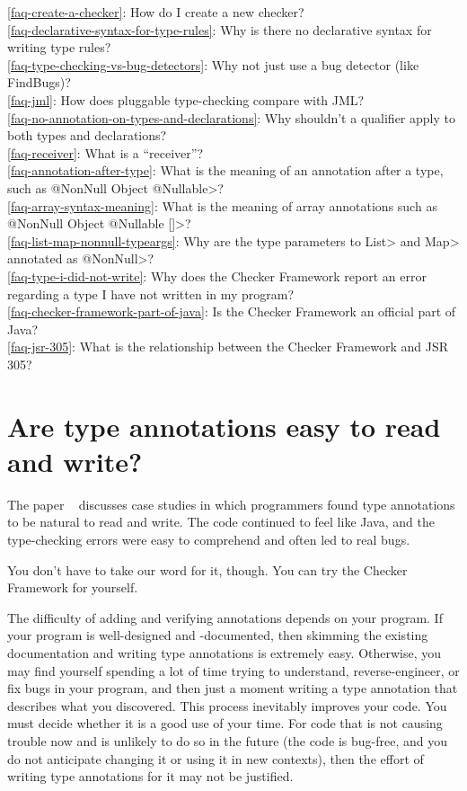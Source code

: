\ref{faq-create-a-checker}: How do I create a new checker? \\
\ref{faq-declarative-syntax-for-type-rules}: Why is there no declarative syntax for writing type rules? \\
\ref{faq-type-checking-vs-bug-detectors}: Why not just use a bug detector (like FindBugs)? \\
\ref{faq-jml}: How does pluggable type-checking compare with JML? \\
\ref{faq-no-annotation-on-types-and-declarations}: Why shouldn't a qualifier apply to both types and declarations? \\
\ref{faq-receiver}: What is a ``receiver''? \\
\ref{faq-annotation-after-type}: What is the meaning of an annotation after a type, such as \<@NonNull Object @Nullable>? \\
\ref{faq-array-syntax-meaning}: What is the meaning of array annotations such as \<@NonNull Object @Nullable []>? \\
\ref{faq-list-map-nonnull-typeargs}: Why are the type parameters to \<List> and \<Map> annotated as \<@NonNull>? \\
\ref{faq-type-i-did-not-write}: Why does the Checker Framework report an error regarding a type I have not written in my program? \\
\ref{faq-checker-framework-part-of-java}: Is the Checker Framework an official part of Java? \\
\ref{faq-jsr-305}: What is the relationship between the Checker Framework and JSR 305?



\section{Are type annotations easy to read and write?\label{faq-ease-of-use}}

The paper
~\cite{PapiACPE2008} discusses case studies in
which programmers
found type annotations to be natural to read and write.  The code
continued to feel like Java, and the type-checking errors were easy to
comprehend and often led to real bugs.

You don't have to take our word for it, though.  You can try the
Checker Framework for yourself.

The difficulty of adding and verifying annotations depends on your program.
If your program is well-designed and -documented, then skimming the
existing documentation and writing type annotations is extremely easy.
Otherwise, you may find yourself spending a lot of time trying to
understand, reverse-engineer, or fix bugs in your program, and then just a
moment writing a type annotation that describes what you discovered.  This
process inevitably improves your code.  You must decide whether it is a
good use of your time.  For code that is not causing trouble now and is
unlikely to do so in the future (the code is bug-free, and you do not
anticipate changing it or using it in new contexts), then the
effort of writing type annotations for it may not be justified.


